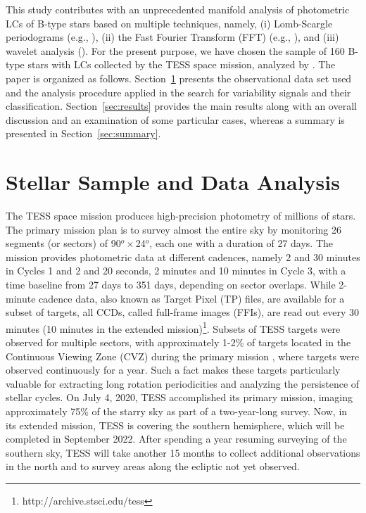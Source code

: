 \documentclass[RNAAS]{aastex63}
\begin{document}
This study contributes with an unprecedented manifold analysis of photometric LCs of B-type stars based on multiple techniques, namely, (i) Lomb-Scargle periodograms (e.g., \citealp{Scargle1982,Horne1986,Press1989}), (ii) the Fast Fourier Transform (FFT) (e.g., \citealp{Zhan2019}), and (iii) wavelet analysis (\citealp{Grossmann1984}). For the present purpose, we have chosen the sample of 160 B-type stars with LCs collected by the TESS space mission, analyzed by \citet{Balona2019}. The paper is organized as follows. Section~\ref{observation} presents the observational data set used and the analysis procedure applied in the search for variability signals and their classification. Section~\ref{sec:results} provides the main results along with an overall discussion and an examination of some particular cases, whereas a summary is presented in Section~\ref{sec:summary}.

\section{Stellar Sample and Data Analysis} \label{observation}

The TESS space mission \citep{Ricker2015} produces high-precision photometry of millions of stars. The primary mission plan is to survey almost the entire sky by monitoring 26 segments (or sectors) of 90$^o\times$24$^o$, each one with a duration of 27 days. The mission provides photometric data at different cadences, namely 2 and 30 minutes in Cycles 1 and 2 and 20 seconds, 2 minutes and 10 minutes in Cycle 3, with a time baseline from 27 days to 351 days, depending on sector overlaps. While 2-minute cadence data, also known as Target Pixel (TP) files, are available for a subset of targets, all CCDs, called full-frame images (FFIs), are read out every 30 minutes (10 minutes in the extended mission)\footnote{http://archive.stsci.edu/tess}. Subsets of TESS targets were observed for multiple sectors, with approximately 1-2\% of targets located in the Continuous Viewing Zone (CVZ) during the primary mission \citep{Barclay2018}, where targets were observed continuously for a year. Such a fact makes these targets particularly valuable for extracting long rotation periodicities and analyzing the persistence of stellar cycles. On July 4, 2020, TESS accomplished its primary mission, imaging approximately 75\% of the starry sky as part of a two-year-long survey. Now, in its extended mission, TESS is covering the southern hemisphere, which will be completed in September 2022. After spending a year resuming surveying of the southern sky, TESS will take another 15 months to collect additional observations in the north and to survey areas along the ecliptic not yet observed.
\end{document}
